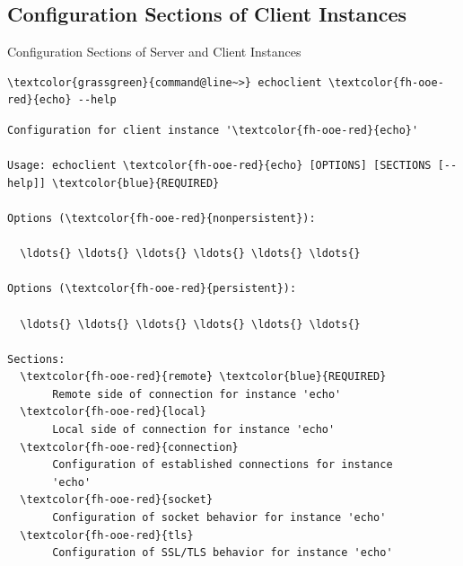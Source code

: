 \subsection{Configuration Sections of Client Instances}

\begin{frame}[fragile]{Configuration Sections of Server and Client Instances}
\begin{scriptsize}
\begin{Verbatim}[commandchars=\\\{\}]
\textcolor{grassgreen}{command@line~>} echoclient \textcolor{fh-ooe-red}{echo} --help
\end{Verbatim}
\begin{Verbatim}[commandchars=\\\{\},frame=leftline,rulecolor=\color{fh-ooe-red}]
Configuration for client instance '\textcolor{fh-ooe-red}{echo}'

Usage: echoclient \textcolor{fh-ooe-red}{echo} [OPTIONS] [SECTIONS [--help]] \textcolor{blue}{REQUIRED}

Options (\textcolor{fh-ooe-red}{nonpersistent}):

  \ldots{} \ldots{} \ldots{} \ldots{} \ldots{} \ldots{}

Options (\textcolor{fh-ooe-red}{persistent}):

  \ldots{} \ldots{} \ldots{} \ldots{} \ldots{} \ldots{}

Sections:
  \textcolor{fh-ooe-red}{remote} \textcolor{blue}{REQUIRED}
       Remote side of connection for instance 'echo'
  \textcolor{fh-ooe-red}{local}
       Local side of connection for instance 'echo'
  \textcolor{fh-ooe-red}{connection}
       Configuration of established connections for instance
       'echo'
  \textcolor{fh-ooe-red}{socket}
       Configuration of socket behavior for instance 'echo'
  \textcolor{fh-ooe-red}{tls}
       Configuration of SSL/TLS behavior for instance 'echo'
\end{Verbatim}
\end{scriptsize}
\end{frame}

